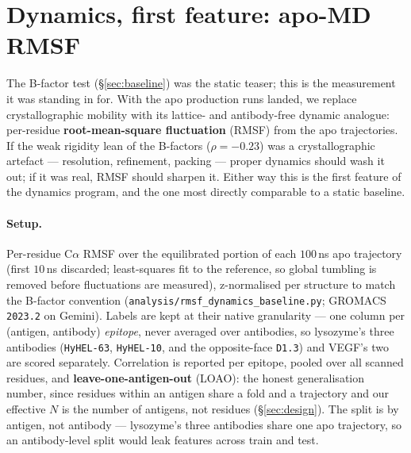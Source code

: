 \section{Dynamics, first feature: apo-MD RMSF}\label{sec:rmsf}

The B-factor test (\S\ref{sec:baseline}) was the static teaser; this is the measurement it was
standing in for. With the apo production runs landed, we replace crystallographic mobility with
its lattice- and antibody-free dynamic analogue: per-residue \textbf{root-mean-square fluctuation}
(RMSF) from the apo trajectories. If the weak rigidity lean of the B-factors ($\rho=-0.23$) was a
crystallographic artefact --- resolution, refinement, packing --- proper dynamics should wash it out;
if it was real, RMSF should sharpen it. Either way this is the first feature of the dynamics program,
and the one most directly comparable to a static baseline.

\paragraph{Setup.} Per-residue C$\alpha$ RMSF over the equilibrated portion of each $100$\,ns apo
trajectory (first $10$\,ns discarded; least-squares fit to the reference, so global tumbling is removed
before fluctuations are measured), z-normalised per structure to match the B-factor convention
(\texttt{analysis/rmsf\_dynamics\_baseline.py}; GROMACS \texttt{2023.2} on Gemini). Labels are kept
at their native granularity --- one column per (antigen, antibody) \emph{epitope}, never averaged over
antibodies, so lysozyme's three antibodies (\texttt{HyHEL-63}, \texttt{HyHEL-10}, and the opposite-face
\texttt{D1.3}) and VEGF's two are scored separately. Correlation is reported per epitope, pooled over
all scanned residues, and \textbf{leave-one-antigen-out} (LOAO): the honest generalisation number,
since residues within an antigen share a fold and a trajectory and our effective $N$ is the number of
antigens, not residues (\S\ref{sec:design}). The split is by antigen, not antibody --- lysozyme's three
antibodies share one apo trajectory, so an antibody-level split would leak features across train and test.


